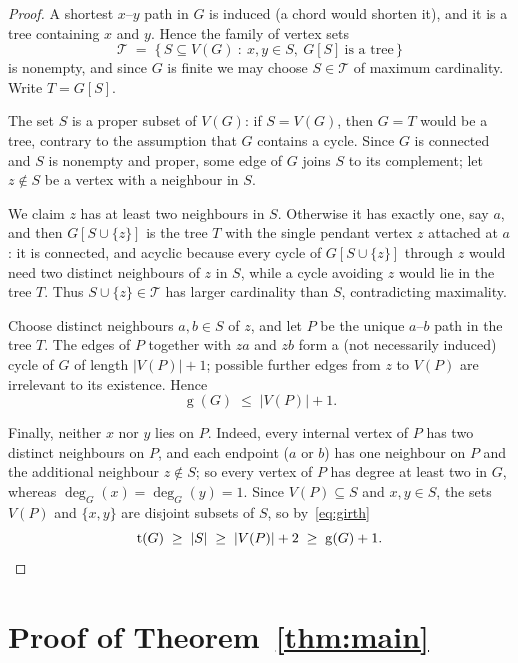 \documentclass[11pt]{article}
\numberwithin{equation}{section}
\theoremstyle{remark}
\newcommand{\tr}{\operatorname{t}}
\newcommand{\gr}{\operatorname{g}}
\begin{document}
\begin{proof}
A shortest $x$--$y$ path in $G$ is induced (a chord would shorten it), and it
is a tree containing $x$ and $y$.  Hence the family of vertex sets
\[
  \mathcal{T}\;=\;\{\,S\subseteq V(G)\ :\ x,y\in S,\ G[S]\ \text{is a tree}\,\}
\]
is nonempty, and since $G$ is finite we may choose $S\in\mathcal{T}$ of
maximum cardinality.  Write $T=G[S]$.

The set $S$ is a proper subset of $V(G)$: if $S=V(G)$, then $G=T$ would be a
tree, contrary to the assumption that $G$ contains a cycle.  Since $G$ is
connected and $S$ is nonempty and proper, some edge of $G$ joins $S$ to its
complement; let $z\notin S$ be a vertex with a neighbour in $S$.

We claim $z$ has at least two neighbours in $S$.  Otherwise it has exactly
one, say $a$, and then $G[S\cup\{z\}]$ is the tree $T$ with the single pendant
vertex $z$ attached at $a$: it is connected, and acyclic because every cycle
of $G[S\cup\{z\}]$ through $z$ would need two distinct neighbours of $z$ in
$S$, while a cycle avoiding $z$ would lie in the tree $T$.  Thus
$S\cup\{z\}\in\mathcal{T}$ has larger cardinality than $S$, contradicting
maximality.

Choose distinct neighbours $a,b\in S$ of $z$, and let $P$ be the unique
$a$--$b$ path in the tree $T$.  The edges of $P$ together with $za$ and $zb$
form a (not necessarily induced) cycle of $G$ of length $|V(P)|+1$; possible
further edges from $z$ to $V(P)$ are irrelevant to its existence.  Hence
\begin{equation}\label{eq:girth}
  \gr(G)\;\le\;|V(P)|+1 .
\end{equation}

Finally, neither $x$ nor $y$ lies on $P$.  Indeed, every internal vertex of
$P$ has two distinct neighbours on $P$, and each endpoint ($a$ or $b$) has one
neighbour on $P$ and the additional neighbour $z\notin S$; so every vertex of
$P$ has degree at least two in $G$, whereas $\deg_G(x)=\deg_G(y)=1$.  Since
$V(P)\subseteq S$ and $x,y\in S$, the sets $V(P)$ and $\{x,y\}$ are disjoint
subsets of $S$, so by~\eqref{eq:girth}
\[
  \tr(G)\;\ge\;|S|\;\ge\;|V(P)|+2\;\ge\;\gr(G)+1 . \qedhere
\]
\end{proof}

\section{Proof of Theorem~\ref{thm:main}}
\end{document}
